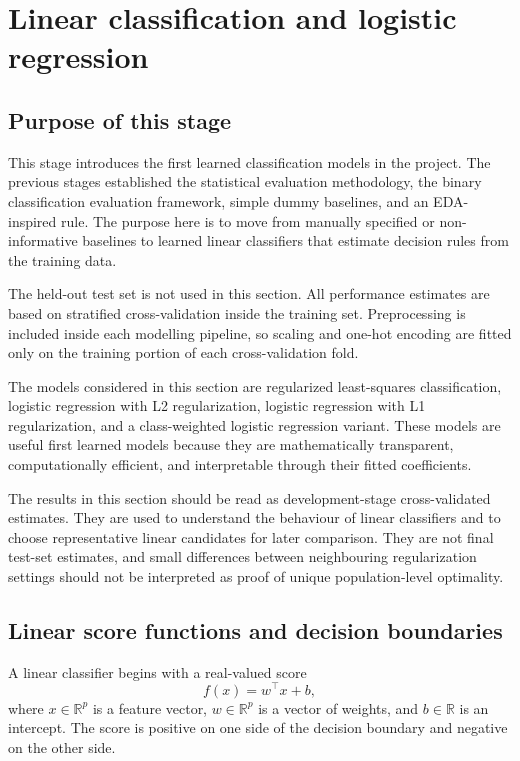 \section{Linear classification and logistic regression}
\label{sec:linear-classification-and-logistic-regression}

\subsection{Purpose of this stage}

This stage introduces the first learned classification models in the project. The previous stages established the statistical evaluation methodology, the binary classification evaluation framework, simple dummy baselines, and an EDA-inspired rule. The purpose here is to move from manually specified or non-informative baselines to learned linear classifiers that estimate decision rules from the training data.

The held-out test set is not used in this section. All performance estimates are based on stratified cross-validation inside the training set. Preprocessing is included inside each modelling pipeline, so scaling and one-hot encoding are fitted only on the training portion of each cross-validation fold.

The models considered in this section are regularized least-squares classification, logistic regression with L2 regularization, logistic regression with L1 regularization, and a class-weighted logistic regression variant. These models are useful first learned models because they are mathematically transparent, computationally efficient, and interpretable through their fitted coefficients.

The results in this section should be read as development-stage cross-validated estimates. They are used to understand the behaviour of linear classifiers and to choose representative linear candidates for later comparison. They are not final test-set estimates, and small differences between neighbouring regularization settings should not be interpreted as proof of unique population-level optimality.

\subsection{Linear score functions and decision boundaries}

A linear classifier begins with a real-valued score
\[
f(x) = w^\top x + b,
\]
where \(x \in \mathbb{R}^p\) is a feature vector, \(w \in \mathbb{R}^p\) is a vector of weights, and \(b \in \mathbb{R}\) is an intercept. The score is positive on one side of the decision boundary and negative on the other side.

